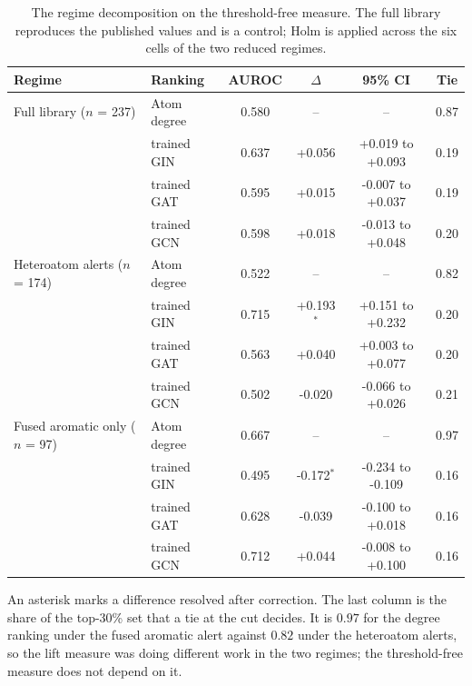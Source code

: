 \begin{table}[htbp]
\centering
\caption{The regime decomposition on the threshold-free measure. The full library reproduces the published values and is a control; Holm is applied across the six cells of the two reduced regimes.}
\label{tab:regime_auroc}
\footnotesize
\setlength{\tabcolsep}{4pt}
\begin{tabular}{llcccc}
\toprule
Regime & Ranking & AUROC & $\Delta$ & 95\% CI & Tie \\
\midrule
Full library ($n$ = 237) & Atom degree & 0.580 & -- & -- & 0.87 \\
 & trained GIN & 0.637 & +0.056 & +0.019 to +0.093 & 0.19 \\
 & trained GAT & 0.595 & +0.015 & -0.007 to +0.037 & 0.19 \\
 & trained GCN & 0.598 & +0.018 & -0.013 to +0.048 & 0.20 \\
Heteroatom alerts ($n$ = 174) & Atom degree & 0.522 & -- & -- & 0.82 \\
 & trained GIN & 0.715 & +0.193$^{*}$ & +0.151 to +0.232 & 0.20 \\
 & trained GAT & 0.563 & +0.040 & +0.003 to +0.077 & 0.20 \\
 & trained GCN & 0.502 & -0.020 & -0.066 to +0.026 & 0.21 \\
Fused aromatic only ($n$ = 97) & Atom degree & 0.667 & -- & -- & 0.97 \\
 & trained GIN & 0.495 & -0.172$^{*}$ & -0.234 to -0.109 & 0.16 \\
 & trained GAT & 0.628 & -0.039 & -0.100 to +0.018 & 0.16 \\
 & trained GCN & 0.712 & +0.044 & -0.008 to +0.100 & 0.16 \\
\bottomrule
\end{tabular}
\begin{flushleft}\footnotesize An asterisk marks a difference resolved after correction. The last column is the share of the top-30\% set that a tie at the cut decides. It is $0.97$ for the degree ranking under the fused aromatic alert against $0.82$ under the heteroatom alerts, so the lift measure was doing different work in the two regimes; the threshold-free measure does not depend on it.\end{flushleft}
\end{table}
